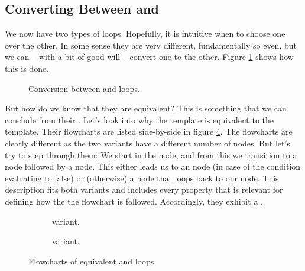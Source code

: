 \subsection{Converting Between  and }

We now have two types of loops. Hopefully, it is intuitive when to choose one over the other. In some sense they are very different, fundamentally so even, but we can -- with a bit of good will -- convert one to the other. Figure \ref{fig:flow:repetition:whiledowhile} shows how this is done.

\begin{figure}[tbp]
  
  \caption{Conversion between  and  loops.}
  \label{fig:flow:repetition:whiledowhile}
\end{figure}

But how do we know that they are equivalent? This is something that we can conclude from their . Let's look into why the  template is equivalent to the  template. Their flowcharts are listed side-by-side in figure \ref{fig:flow:repetition:conversion}. The flowcharts are clearly different as the two variants have a different number of nodes. But let's try to step through them: We start in the  node, and from this we transition to a  node followed by a  node. This either leads us to an  node (in case of the condition evaluating to false) or (otherwise) a  node that loops back to our  node. This description fits both variants and includes every property that is relevant for defining how the the flowchart is followed. Accordingly, they exhibit a .

\begin{figure}[tbp]
  \newcommand{\figscale}[0]{0.8}
  \begin{subfigure}[t]{0.5\textwidth}
    \centering
    \scalebox{\figscale}{}
    \caption{ variant.}
    \label{fig:flow:repetition:conversion:dowhile:hl}
  \end{subfigure}
  \begin{subfigure}[t]{0.5\textwidth}
    \centering
    \scalebox{\figscale}{}
    \caption{ variant.}
    \label{fig:flow:repetition:conversion:while:hl}
  \end{subfigure}
  \caption{Flowcharts of equivalent  and  loops.}
  \label{fig:flow:repetition:conversion}
\end{figure}

